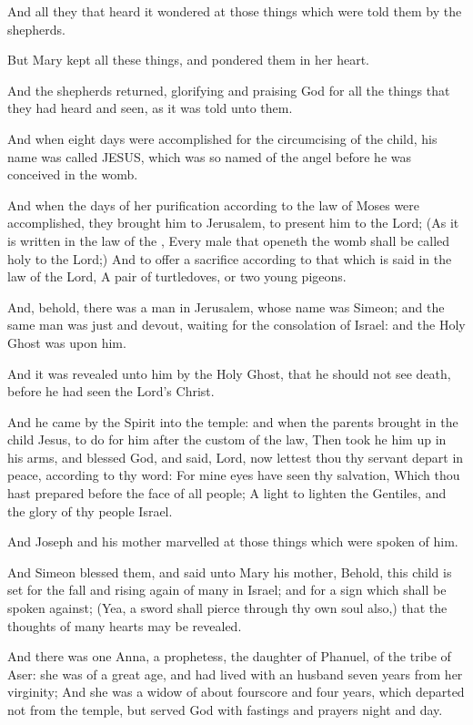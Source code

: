 \Verse And all they that heard it wondered at those things which were told them by the shepherds.

\Verse But Mary kept all these things, and pondered them in her heart.

\Verse And the shepherds returned, glorifying and praising God for all the things that they had heard and seen, as it was told unto them.

\Verse And when eight days were accomplished for the circumcising of the child, his name was called JESUS, which was so named of the angel before he was conceived in the womb.

\Verse And when the days of her purification according to the law of Moses were accomplished, they brought him to Jerusalem, to present him to the Lord; \Verse (As it is written in the law of the \LORD, Every male that openeth the womb shall be called holy to the Lord;) \Verse And to offer a sacrifice according to that which is said in the law of the Lord, A pair of turtledoves, or two young pigeons.

\Verse And, behold, there was a man in Jerusalem, whose name was Simeon; and the same man was just and devout, waiting for the consolation of Israel: and the Holy Ghost was upon him.

\Verse And it was revealed unto him by the Holy Ghost, that he should not see death, before he had seen the Lord's Christ.

\Verse And he came by the Spirit into the temple: and when the parents brought in the child Jesus, to do for him after the custom of the law, \Verse Then took he him up in his arms, and blessed God, and said, \Verse Lord, now lettest thou thy servant depart in peace, according to thy word: \Verse For mine eyes have seen thy salvation, \Verse Which thou hast prepared before the face of all people; \Verse A light to lighten the Gentiles, and the glory of thy people Israel.

\Verse And Joseph and his mother marvelled at those things which were spoken of him.

\Verse And Simeon blessed them, and said unto Mary his mother, Behold, this child is set for the fall and rising again of many in Israel; and for a sign which shall be spoken against; \Verse (Yea, a sword shall pierce through thy own soul also,) that the thoughts of many hearts may be revealed.

\Verse And there was one Anna, a prophetess, the daughter of Phanuel, of the tribe of Aser: she was of a great age, and had lived with an husband seven years from her virginity; \Verse And she was a widow of about fourscore and four years, which departed not from the temple, but served God with fastings and prayers night and day.

